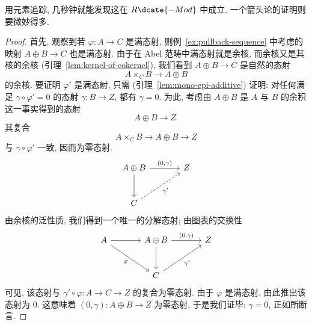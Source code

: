 \indent 用元素追踪, 几秒钟就能发现这在 $R\dcate{-Mod}$ 中成立. 一个箭头论的证明则要微妙得多.

\begin{proof}
首先, 观察到若 $\varphi:A\to C$ 是满态射, 则例~\ref{ex:pullback-sequence} 中考虑的映射 $A\oplus B\to C$ 也是满态射. 由于在 Abel 范畴中满态射就是余核, 而余核又是其核的余核 (引理~\ref{lem:kernel-of-cokernel}), 我们看到 $A\oplus B\to C$ 是自然的态射
\[
A\times_C B\to A\oplus B
\]
的余核.
要证明 $\varphi'$ 是满态射, 只需 (引理~\ref{lem:mono-epi-additive}) 证明: 对任何满足 $\gamma\circ\varphi'=0$ 的态射 $\gamma:B\to Z$, 都有 $\gamma=0$.
为此, 考虑由 $A\oplus B$ 是 $A$ 与 $B$ 的余积这一事实得到的态射
\[
A\oplus B\to Z.
\]
其复合
\[
A\times_C B\to A\oplus B\to Z
\]
与 $\gamma\circ\varphi'$ 一致, 因而为零态射. 
\[
\begin{tikzcd}[ampersand replacement=\&,column sep=large,row sep=large]
A\oplus B \ar[r,"(0{,}\gamma)"] \ar[d] \& Z \\
C \ar[ur,dashed,"\gamma'"'] \&
\end{tikzcd}
\]
由余核的泛性质, 我们得到一个唯一的分解态射; 由图表的交换性
\[
\begin{tikzcd}[ampersand replacement=\&,column sep=large,row sep=large]
A \ar[r] \ar[dr,"\varphi"'] \& A\oplus B \ar[r,"(0{,}\gamma)"] \ar[d] \& Z \\
\& C \ar[ur,"\gamma'"'] \&
\end{tikzcd}
\]
可见, 该态射与 $\gamma'\circ\varphi:A\to C\to Z$ 的复合为零态射. 由于 $\varphi$ 是满态射, 由此推出该态射为 $0$. 这意味着 $(0,\gamma):A\oplus B\to Z$ 为零态射, 于是我们证毕: $\gamma=0$, 正如所断言.
\end{proof}

